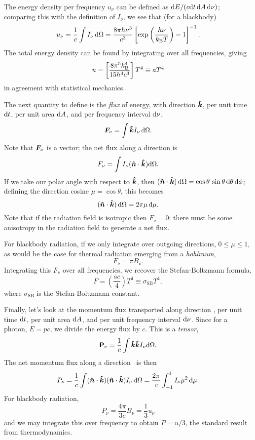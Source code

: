 The energy density per frequency $u_{\nu}$ can be defined as $\mathrm{d} E/(c \mathrm{d} t\,\mathrm{d} A\,\mathrm{d}\nu)$; comparing this with the definition of $I_{\nu}$, we see that (for a blackbody)
\begin{equation}\label{e.radiation-energy-density}
u_{\nu} = \frac{1}{c}\int I_{\nu}\,\mathrm{d}\Omega = \frac{8\pi h\nu^{3}}{c^{3}}\left[\exp\left(\frac{h\nu}{k_\mathrm{B} T}\right)-1\right]^{-1}.
\end{equation}
The total energy density can be found by integrating over all frequencies, giving
\[ u = \left[\frac{8\pi^{5}k_\mathrm{B}^{4}}{15 h^{3}c^{3}}\right] T^{4}\equiv aT^{4} \]
in agreement with statistical mechanics.

The next quantity to define is the \emph{flux} of energy, with direction $\boldsymbol{\hat{k}}$, per unit time $\mathrm{d} t$,  per unit area $\mathrm{d} A$, and per frequency interval $\mathrm{d}\nu$,
\begin{equation}\label{e.radiation-flux}
\boldsymbol{F}_{\nu} = \int \boldsymbol{\hat{k}} I_{\nu} \,\mathrm{d}\Omega.
\end{equation}
Note that $\boldsymbol{F}_{\nu}$ is a vector;  the net flux along a direction \unitn is
\[ F_{\nu} = \int I_{\nu}(\boldsymbol{\hat{n}}\cdot\boldsymbol{\hat{k}})\mathrm{d}\Omega. \]
If we take our polar angle with respect to $\boldsymbol{\hat{k}}$, then $(\boldsymbol{\hat{n}}\cdot\boldsymbol{\hat{k}})\,\mathrm{d}\Omega = \cos\theta\,\sin\theta\,\mathrm{d}\theta\,\mathrm{d} \phi$; defining the direction cosine $\mu = \cos\theta$, this becomes 
\[ (\boldsymbol{\hat{n}}\cdot\boldsymbol{\hat{k}})\,\mathrm{d}\Omega = 2\pi \mu\,\mathrm{d}\mu. \]
Note that if the radiation field is isotropic then $F_{\nu}=0$: there must be some anisotropy in the radiation field to generate a net flux.

For blackbody radiation, if we only integrate over outgoing directions, $0\le \mu\le 1$, as would be the case for thermal radiation emerging from a \emph{hohlraum},
\[ F_{\nu} = \pi B_{\nu}.\]
Integrating this $F_{\nu}$ over all frequencies, we recover the Stefan-Boltzmann formula,
\[ F = \left(\frac{ac}{4}\right) T^{4} \equiv \sigma_{\mathrm{SB}} T^{4}, \]
where $\sigma_{\mathrm{SB}}$ is the Stefan-Boltzmann constant.

Finally, let's look at the momentum flux transported along direction \unitk, per unit time $\mathrm{d} t$, per unit area $\mathrm{d} A$, and per unit frequency interval $\mathrm{d}\nu$.  Since for a photon, $E = pc$, we divide the energy flux by $c$.
This is a \emph{tensor},
\begin{equation}\label{e.radiation-pressure-tensor}
\boldsymbol{\mathsf{P}}_{\nu} = \frac{1}{c}\int \boldsymbol{\hat{k}}\boldsymbol{\hat{k}} I_{\nu}\mathrm{d}\Omega.
\end{equation}
The net momentum flux along a direction \unitn\ is then
\[ P_{\nu} = \frac{1}{c}\int (\boldsymbol{\hat{n}}\cdot\boldsymbol{\hat{k}})(\boldsymbol{\hat{n}}\cdot\boldsymbol{\hat{k}}) I_{\nu}\,\mathrm{d} \Omega = \frac{2\pi}{c}\int_{-1}^{1} I_{\nu}\mu^{2}\,\mathrm{d}\mu. \]
For blackbody radiation, 
\[ P_{\nu} = \frac{4\pi}{3c} B_{\nu}  = \frac{1}{3}u_{\nu}\]
and we may integrate this over frequency to obtain $P = u/3$, the standard result from thermodynamics.

